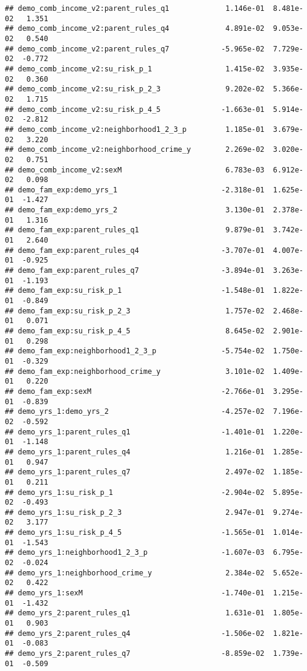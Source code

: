 \documentclass[
]{article}
\begin{document}
\begin{verbatim}
## demo_comb_income_v2:parent_rules_q1             1.146e-01  8.481e-02   1.351
## demo_comb_income_v2:parent_rules_q4             4.891e-02  9.053e-02   0.540
## demo_comb_income_v2:parent_rules_q7            -5.965e-02  7.729e-02  -0.772
## demo_comb_income_v2:su_risk_p_1                 1.415e-02  3.935e-02   0.360
## demo_comb_income_v2:su_risk_p_2_3               9.202e-02  5.366e-02   1.715
## demo_comb_income_v2:su_risk_p_4_5              -1.663e-01  5.914e-02  -2.812
## demo_comb_income_v2:neighborhood1_2_3_p         1.185e-01  3.679e-02   3.220
## demo_comb_income_v2:neighborhood_crime_y        2.269e-02  3.020e-02   0.751
## demo_comb_income_v2:sexM                        6.783e-03  6.912e-02   0.098
## demo_fam_exp:demo_yrs_1                        -2.318e-01  1.625e-01  -1.427
## demo_fam_exp:demo_yrs_2                         3.130e-01  2.378e-01   1.316
## demo_fam_exp:parent_rules_q1                    9.879e-01  3.742e-01   2.640
## demo_fam_exp:parent_rules_q4                   -3.707e-01  4.007e-01  -0.925
## demo_fam_exp:parent_rules_q7                   -3.894e-01  3.263e-01  -1.193
## demo_fam_exp:su_risk_p_1                       -1.548e-01  1.822e-01  -0.849
## demo_fam_exp:su_risk_p_2_3                      1.757e-02  2.468e-01   0.071
## demo_fam_exp:su_risk_p_4_5                      8.645e-02  2.901e-01   0.298
## demo_fam_exp:neighborhood1_2_3_p               -5.754e-02  1.750e-01  -0.329
## demo_fam_exp:neighborhood_crime_y               3.101e-02  1.409e-01   0.220
## demo_fam_exp:sexM                              -2.766e-01  3.295e-01  -0.839
## demo_yrs_1:demo_yrs_2                          -4.257e-02  7.196e-02  -0.592
## demo_yrs_1:parent_rules_q1                     -1.401e-01  1.220e-01  -1.148
## demo_yrs_1:parent_rules_q4                      1.216e-01  1.285e-01   0.947
## demo_yrs_1:parent_rules_q7                      2.497e-02  1.185e-01   0.211
## demo_yrs_1:su_risk_p_1                         -2.904e-02  5.895e-02  -0.493
## demo_yrs_1:su_risk_p_2_3                        2.947e-01  9.274e-02   3.177
## demo_yrs_1:su_risk_p_4_5                       -1.565e-01  1.014e-01  -1.543
## demo_yrs_1:neighborhood1_2_3_p                 -1.607e-03  6.795e-02  -0.024
## demo_yrs_1:neighborhood_crime_y                 2.384e-02  5.652e-02   0.422
## demo_yrs_1:sexM                                -1.740e-01  1.215e-01  -1.432
## demo_yrs_2:parent_rules_q1                      1.631e-01  1.805e-01   0.903
## demo_yrs_2:parent_rules_q4                     -1.506e-02  1.821e-01  -0.083
## demo_yrs_2:parent_rules_q7                     -8.859e-02  1.739e-01  -0.509

\end{verbatim}
\end{document}

